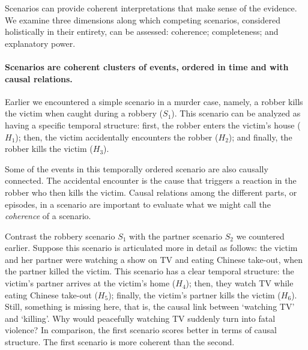 \documentclass[10pt]{article}
\begin{document}

Scenarios can provide coherent interpretations that make sense of the evidence.
We examine three dimensions along which competing scenarios, considered holistically in their entirety, 
can be assessed: coherence; completeness; and explanatory power.  

 
\paragraph{Scenarios are coherent clusters 
of events, ordered in time and with causal relations.} 
Earlier we encountered a simple scenario in a murder case, namely, 
a robber kills the victim when caught during a robbery ($S_1$). This scenario 
can be analyzed as having a specific 
temporal structure:
first, the robber enters the victim's house ($H_1$); then, the victim accidentally encounters the robber ($H_2$); and finally, 
the robber kills the victim ($H_3$). 

Some of the events in this temporally 
ordered scenario are also causally connected. %
The accidental encounter is the cause that triggers a reaction 
in the robber who then kills the victim. 
Causal relations among the different parts, or episodes, 
in a scenario are important to evaluate what we might 
call the \textit{coherence} of a scenario. 

Contrast the robbery scenario $S_1$
with the partner scenario $S_2$ we countered earlier.
Suppose this scenario is articulated more in detail as follows: 
the victim and her partner were watching a show on TV and eating Chinese take-out, 
when the partner killed the victim. 
This scenario has a clear temporal structure: the victim's partner arrives at the victim's home ($H_4$); then, 
they watch TV while eating Chinese take-out ($H_5$); finally, the victim's partner kills the victim ($H_6$). 
Still, something is missing here, that is, the causal link between `watching TV' and `killing'. Why would peacefully 
watching TV suddenly turn into fatal violence?
In comparison, the first scenario scores better in terms 
of causal structure. The first scenario 
is more coherent than the second. 
\end{document}
